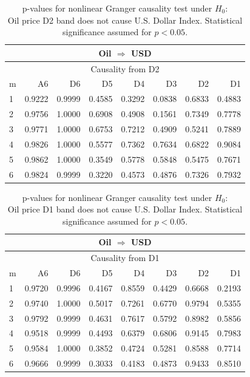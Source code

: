 %
%
\begin{table}[H]
\begin{center}
\begin{tabular}{l|r r r r r r r}
\hline\hline
\multicolumn{8}{c}{Oil $\Rightarrow$ USD}\\
\hline
\multicolumn{8}{c}{Causality from D2}\\
\hline\hline
m & A6 & D6 & D5 & D4 & D3 & D2 & D1 \\
\hline
1 & 0.9222 & 0.9999 & 0.4585 & 0.3292 & 0.0838 & 0.6833 & 0.4883 \\
2 & 0.9756 & 1.0000 & 0.6908 & 0.4908 & 0.1561 & 0.7349 & 0.7778 \\
3 & 0.9771 & 1.0000 & 0.6753 & 0.7212 & 0.4909 & 0.5241 & 0.7889 \\
4 & 0.9826 & 1.0000 & 0.5577 & 0.7362 & 0.7634 & 0.6822 & 0.9084 \\
5 & 0.9862 & 1.0000 & 0.3549 & 0.5778 & 0.5848 & 0.5475 & 0.7671 \\
6 & 0.9824 & 0.9999 & 0.3220 & 0.4573 & 0.4876 & 0.7326 & 0.7932 \\
\hline\hline
\end{tabular}
\caption{p-values for nonlinear Granger causality test under $H_0$:\\
Oil price D2 band does not cause U.S. Dollar Index. Statistical significance assumed for $p<0.05$.}
\end{center}
\end{table}

%
%
\begin{table}[H]
\begin{center}
\begin{tabular}{l|r r r r r r r}
\hline\hline
\multicolumn{8}{c}{Oil $\Rightarrow$ USD}\\
\hline
\multicolumn{8}{c}{Causality from D1}\\
\hline\hline
m & A6 & D6 & D5 & D4 & D3 & D2 & D1 \\
\hline
1 & 0.9720 & 0.9996 & 0.4167 & 0.8559 & 0.4429 & 0.6668 & 0.2193 \\
2 & 0.9740 & 1.0000 & 0.5017 & 0.7261 & 0.6770 & 0.9794 & 0.5355 \\
3 & 0.9792 & 0.9999 & 0.4631 & 0.7617 & 0.5792 & 0.8982 & 0.5856 \\
4 & 0.9518 & 0.9999 & 0.4493 & 0.6379 & 0.6806 & 0.9145 & 0.7983 \\
5 & 0.9584 & 1.0000 & 0.3852 & 0.4724 & 0.5281 & 0.8588 & 0.7714 \\
6 & 0.9666 & 0.9999 & 0.3033 & 0.4183 & 0.4873 & 0.9433 & 0.8510 \\
\hline\hline
\end{tabular}
\caption{p-values for nonlinear Granger causality test under $H_0$:\\
Oil price D1 band does not cause U.S. Dollar Index. Statistical significance assumed for $p<0.05$.}
\end{center}
\end{table}

